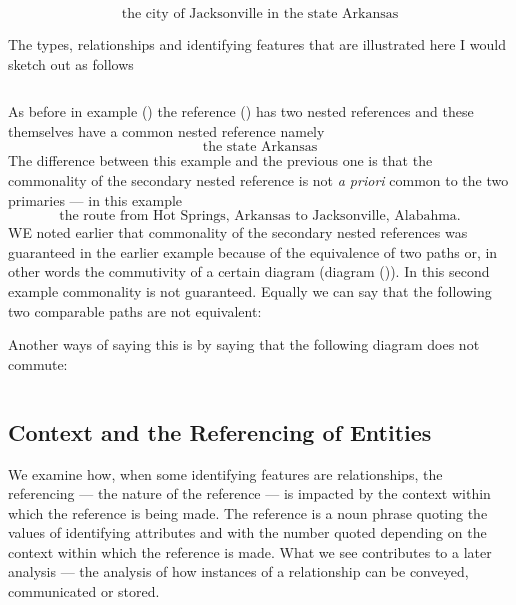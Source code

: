 \begin{equation}
\mbox{the city of Jacksonville in the state  Arkansas}
\end{equation}

The types, relationships and identifying features that are illustrated here
I would sketch out as follows

\begin{equation*}

\end{equation*}
\begin{equation*}

\end{equation*}


\mynote 
As before in example () the reference () has two nested references and these themselves have a common nested reference namely
\begin{equation*}
\mbox{the state Arkansas}
\end{equation*}
The difference between this example and the previous one is that the commonality of the secondary nested reference is not  \textit{a priori}
 common to the two primaries --- in this example
 \begin{equation*}
 \mbox{the route from Hot Springs, Arkansas to Jacksonville, Alabahma.}
\end{equation*}
\mynote
WE noted earlier that commonality of the secondary nested references was guaranteed in the earlier example because of the equivalence of two paths or, in other words the commutivity of a certain diagram (diagram ()).
In this second example commonality is not guaranteed. Equally we can say that the following two comparable paths are not equivalent:

Another ways of saying this is by saying that the following diagram does not commute:
\begin{equation*}

\end{equation*}

\begin{equation*}

\end{equation*}

\begin{oldtt}
\subsection{Context and the Referencing of Entities}
\mynote
We examine how,  when some identifying features are relationships, the referencing 
--- the nature of the reference ---   
is impacted by the context within which the reference is being made. 
The reference is  a noun phrase quoting the values of identifying attributes
and with the number quoted depending on 
the context within which the reference is made.
What we see contributes to a later analysis --- the analysis of  how 
instances of a relationship can be conveyed, communicated or stored.
\end{oldtt}
